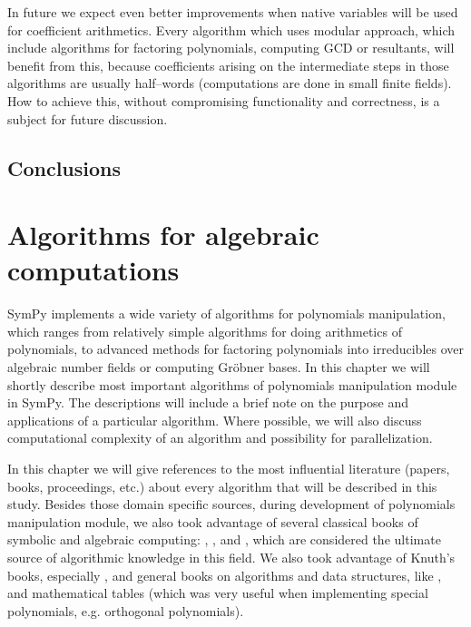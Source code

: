 In future we expect even better improvements when native variables will be used for coefficient
arithmetics. Every algorithm which uses modular approach, which include algorithms for factoring
polynomials, computing GCD or resultants, will benefit from this, because coefficients arising
on the intermediate steps in those algorithms are usually half--words (computations are done in
small finite fields). How to achieve this, without compromising functionality and correctness,
is a subject for future discussion.


\section{Conclusions}



\chapter{Algorithms for algebraic computations}\label{thesis-algorithms}

SymPy implements a wide variety of algorithms for polynomials manipulation, which ranges from
relatively simple algorithms for doing arithmetics of polynomials, to advanced methods for
factoring polynomials into irreducibles over algebraic number fields or computing Gröbner
bases. In this chapter we will shortly describe most important algorithms of polynomials
manipulation module in SymPy. The descriptions will include a brief note on the purpose and
applications of a particular algorithm. Where possible, we will also discuss computational
complexity of an algorithm and possibility for parallelization.

In this chapter we will give references to the most influential literature (papers, books,
proceedings, etc.) about every algorithm that will be described in this study. Besides those
domain specific sources, during development of polynomials manipulation module, we also took
advantage of several classical books of symbolic and algebraic computing: \cite{Davenport1988systems},
\cite{Geddes1992algorithms}, \cite{Gathen1999modern} and \cite{Grabmeier2003algebra}, which are considered the
ultimate source of algorithmic knowledge in this field. We also took advantage of Knuth's books,
especially \cite{Knuth1985seminumerical}, and general books on algorithms and data structures, like
\cite{Cormen2001algorithms}, and mathematical tables \cite{Abramowitz1964handbook} (which was very useful
when implementing special polynomials, e.g. orthogonal polynomials).


